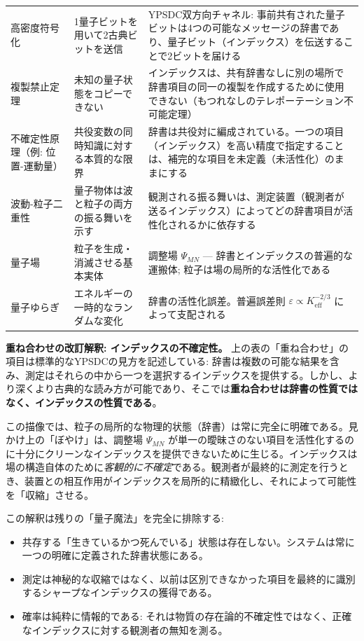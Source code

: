 \documentclass[12pt,a4paper]{article}
\theoremstyle{definition}
\theoremstyle{remark}
\begin{document}
\begin{longtable}{p{3.5cm} p{5cm} p{7cm}}
		高密度符号化 &
		1量子ビットを用いて2古典ビットを送信 &
		YPSDC双方向チャネル: 事前共有された量子ビットは4つの可能なメッセージの辞書であり、量子ビット（インデックス）を伝送することで2ビットを届ける \\
		\addlinespace
		
		複製禁止定理 &
		未知の量子状態をコピーできない &
		インデックスは、共有辞書なしに別の場所で辞書項目の同一の複製を作成するために使用できない（もつれなしのテレポーテーション不可能定理） \\
		\addlinespace
		
		不確定性原理（例: 位置-運動量） &
		共役変数の同時知識に対する本質的な限界 &
		辞書は共役対に編成されている。一つの項目（インデックス）を高い精度で指定することは、補完的な項目を未定義（未活性化）のままにする \\
		\addlinespace
		
		波動-粒子二重性 &
		量子物体は波と粒子の両方の振る舞いを示す &
		観測される振る舞いは、測定装置（観測者が送るインデックス）によってどの辞書項目が活性化されるかに依存する \\
		\addlinespace
		
		量子場 &
		粒子を生成・消滅させる基本実体 &
		調整場 \(\Psi_{MN}\) — 辞書とインデックスの普遍的な運搬体; 粒子は場の局所的な活性化である \\
		\addlinespace
		
		量子ゆらぎ &
		エネルギーの一時的なランダムな変化 &
		辞書の活性化誤差。普遍誤差則 \(\varepsilon \propto K_{\mathrm{eff}}^{-2/3}\) によって支配される \\
	\end{longtable}
	
	\noindent
	\textbf{重ね合わせの改訂解釈: インデックスの不確定性。}
	上の表の「重ね合わせ」の項目は標準的なYPSDCの見方を記述している: 辞書は複数の可能な結果を含み、測定はそれらの中から一つを選択するインデックスを提供する。しかし、より深くより古典的な読み方が可能であり、そこでは\textbf{重ね合わせは辞書の性質ではなく、インデックスの性質である}。
	
	この描像では、粒子の局所的な物理的状態（辞書）は常に完全に明確である。見かけ上の「ぼやけ」は、調整場 $\Psi_{MN}$ が単一の曖昧さのない項目を活性化するのに十分にクリーンなインデックスを提供できないために生じる。インデックスは場の構造自体のために\emph{客観的に不確定}である。観測者が最終的に測定を行うとき、装置との相互作用がインデックスを局所的に精緻化し、それによって可能性を「収縮」させる。
	
	この解釈は残りの「量子魔法」を完全に排除する:
	\begin{itemize}[leftmargin=*]
		\item 共存する「生きているかつ死んでいる」状態は存在しない。システムは常に一つの明確に定義された辞書状態にある。
		\item 測定は神秘的な収縮ではなく、以前は区別できなかった項目を最終的に識別するシャープなインデックスの獲得である。
		\item 確率は純粋に情報的である: それは物質の存在論的不確定性ではなく、正確なインデックスに対する観測者の無知を測る。
	\end{itemize}
	
\end{document}
